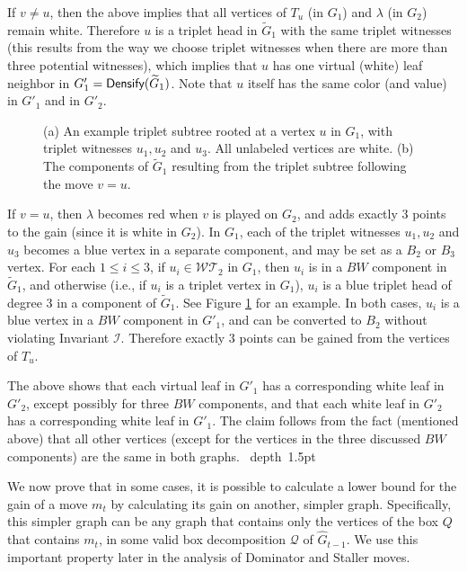 \documentclass[11pt]{article}
\def\blackslug{\hbox{\hskip 1pt \vrule width 4pt height 8pt
    depth 1.5pt \hskip 1pt}}
\def\QED{\quad\blackslug\lower 8.5pt\null\par}
\theoremstyle{definition}
\def\invboxes{\mathcal{I}}
\def\densify{\mbox{\sf Densify}}
\begin{document}
If $v \neq u$, then the above implies that all vertices of $T_u$ (in $G_1$) and $\lambda$ (in $G_2$) remain white. Therefore $u$ is a triplet head in $\widetilde{G}_1$ with the same triplet witnesses (this results from the way we choose triplet witnesses when there are more than three potential witnesses), which implies that $u$ has one virtual (white) leaf neighbor in $G'_1 = \densify(\widetilde{G}_1)$.
Note that $u$ itself has the same color (and value) in $G'_1$ and in $G'_2$.

\begin{figure}[thbp]
  \caption{\sf (a) An example triplet subtree rooted at a vertex $u$ in $G_1$, with triplet witnesses $u_1, u_2$ and $u_3$. All unlabeled vertices are white.
		(b) The components of $\widetilde{G}_1$ resulting from the triplet subtree following the move $v = u$.}
  \medskip
  \centering
  \label{fig:triplet_subtree_move}
\end{figure}

If $v = u$, then $\lambda$ becomes red when $v$ is played on $G_2$, and adds exactly $3$ points to the gain (since it is white in $G_2$).
In $G_1$, each of the triplet witnesses $u_1, u_2$ and $u_3$ becomes a blue vertex in a separate component, and may be set as a $B_2$ or $B_3$ vertex.
For each $1 \leq i \leq 3$, if $u_i \in \mathcal{WT}_2$ in $G_1$, then $u_i$ is in a $BW$ component in $\widetilde{G}_1$, and otherwise (i.e., if $u_i$ is a triplet vertex in $G_1$), $u_i$ is a blue triplet head of degree $3$ in a component of $\widetilde{G}_1$. See Figure \ref{fig:triplet_subtree_move} for an example.
In both cases, $u_i$ is a blue vertex in a $BW$ component in $G'_1$, and can be converted to $B_2$ without violating Invariant $\invboxes$.
Therefore exactly $3$ points can be gained from the vertices of $T_u$.

The above shows that each virtual leaf in $G'_1$ has a corresponding white leaf in $G'_2$, except possibly for three $BW$ components, and that each white leaf in $G'_2$ has a corresponding white leaf in $G'_1$.
The claim follows from the fact (mentioned above) that all other vertices (except for the vertices in the three discussed $BW$ components) are the same in both graphs.
\QED

We now prove that in some cases, it is possible to calculate a lower bound for the gain of a move $m_t$ by calculating its gain on another, simpler graph.
Specifically, this simpler graph can be any graph that contains only the vertices of the box $Q$ that contains $m_t$, in some valid box decomposition $\mathcal{Q}$ of $\hat{G}_{t-1}$.
We use this important property later in the analysis of Dominator and Staller moves.
\end{document}

